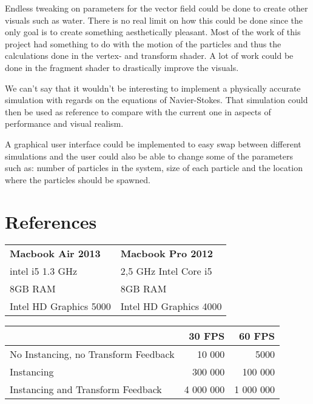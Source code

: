 \documentclass[journal]{vgtc}                %
\begin{document}
Endless tweaking on parameters for the vector field could be done to create other visuals such as water. There is no real limit on how this could be done since the only goal is to create something aesthetically pleasant. Most of the work of this project had something to do with the motion of the particles and thus the calculations done in the vertex- and transform shader. A lot of work could be done in the fragment shader to drastically improve the visuals.
 
We can’t say that it wouldn’t be interesting to implement a physically accurate simulation with regards on the equations of Navier-Stokes. That simulation could then be used as reference to compare with the current one in aspects of performance and visual realism. 

A graphical user interface could be implemented to easy swap between different simulations and the user could also be able to change some of the parameters such as: number of particles in the system, size of each particle and the location where the particles should be spawned. 

\section{References}
	

\def\arraystretch{1.5}%
	\begin{table}[h]
		\begin{tabular}{| ll |}
			\hline
			\textbf{Macbook Air 2013} & \textbf{Macbook Pro 2012} \\[0.75ex] %
			 intel i5 1.3 GHz  &   2,5 GHz Intel Core i5  \\[0.75ex]
			  8GB RAM & 8GB RAM    \\[0.75ex]
		 	 Intel HD Graphics 5000 &  Intel HD Graphics 4000   \\ [0.75ex]
			\hline
		\end{tabular}
	\end{table}	

	

	\begin{table}[h]
		\begin{tabular}{l | r | r}
			  & 30 FPS & 60 FPS   \\[0.75ex] \hline
  			No Instancing, no Transform Feedback & 10 000 & 5000  \\[0.75ex]
  			Instancing & 300 000 & 100 000  \\[0.75ex]
			Instancing and Transform Feedback & 4 000 000 & 1 000 000 \\[0.75ex]


		\end{tabular}
	\end{table}	
\end{document}
